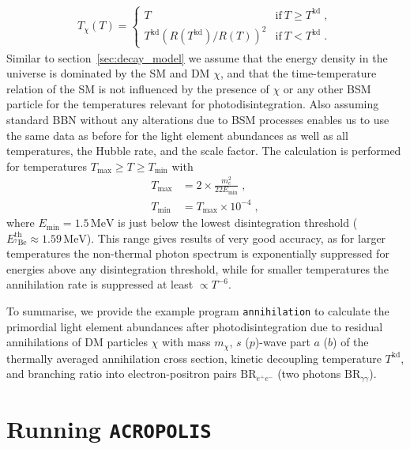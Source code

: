 \documentclass[11pt,a4paper]{article}
\newcommand{\eqsp}{\;}
\begin{document}
\begin{align}
T_\chi (T) = \begin{cases} T & \text{if}~T \geq T^\mathrm{kd} \eqsp, \\
T^\mathrm{kd} (R(T^\mathrm{kd}) / R(T))^2 & \text{if}~T < T^\mathrm{kd}\eqsp. \end{cases}
\end{align}
Similar to section~\ref{sec:decay_model} we assume that the energy density in the universe is dominated by the SM and DM $\chi$, and that the time-temperature relation of the SM is not influenced by the presence of $\chi$ or any other BSM particle for the temperatures relevant for photodisintegration. Also assuming standard BBN without any alterations due to BSM processes enables us to use the same data as before for the light element abundances as well as all temperatures, the Hubble rate, and the scale factor. The calculation is performed for temperatures $T_\mathrm{max} \geq T \geq T_\mathrm{min}$ with
\begin{align}
T_\mathrm{max} &= 2 \times \frac{m_e^2}{22 E_\mathrm{min}} \eqsp, \\
T_\mathrm{min} &= T_\mathrm{max} \times 10^{-4}\eqsp,
\end{align}
where $E_\mathrm{min} = 1.5 \, \mathrm{MeV}$ is just below the lowest disintegration threshold ($E_{{}^7\mathrm{Be}}^\mathrm{th} \approx 1.59 \, \mathrm{MeV}$). This range gives results of very good accuracy, as for larger temperatures the non-thermal photon spectrum is exponentially suppressed for energies above any disintegration threshold, while for smaller temperatures the annihilation rate is suppressed at least $\propto T^{-6}$.

To summarise, we provide the example program \texttt{annihilation} to calculate the primordial light element abundances after photodisintegration due to residual annihilations of DM particles $\chi$ with mass $m_\chi$, $s$ ($p$)-wave part $a$ ($b$) of the thermally averaged annihilation cross section, kinetic decoupling temperature $T^\mathrm{kd}$, and branching ratio into electron-positron pairs $\text{BR}_{e^+ e^-}$ (two photons $\text{BR}_{\gamma \gamma}$).

\section{Running \texttt{ACROPOLIS}}
\end{document}
